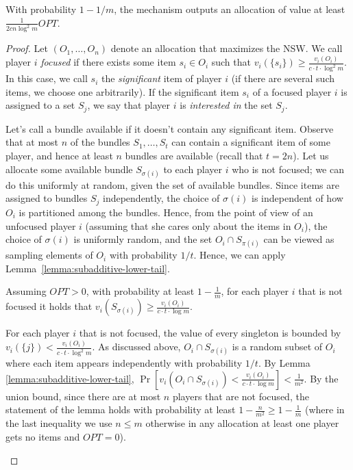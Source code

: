 \documentclass{article}
\begin{document}
\begin{lemma}
With probability $1-1/m$, the mechanism outputs an allocation of value at least  $\frac{1}{2c n \log^2 m} OPT$.
\end{lemma}

\begin{proof}
Let $(O_1,\ldots, O_n)$ denote an allocation that maximizes the NSW. We call player $i$ \emph{focused} if there exists some item $s_i \in O_i$ such that $v_i(\{s_i\})\geq \frac {v_i(O_i)} {c\cdot t \cdot \log^2 m}$. In this case, we call $s_i$ the \emph{significant} item of player $i$ (if there are several such items, we choose one arbitrarily). If the significant item $s_i$ of a focused player $i$ is assigned to a set $S_j$, we say that player $i$ is \emph{interested in} the set $S_j$.

Let's call a bundle available if it doesn't contain any significant item.  Observe that at most $n$ of the bundles $S_1,\ldots,S_t$ can contain a significant item of some player, and hence at least $n$ bundles are available (recall that $t=2n$). Let us allocate some available bundle $S_{\sigma(i)}$ to each player $i$ who is not focused; we can do this uniformly at random, given the set of available bundles. Since items are assigned to bundles $S_j$ independently, the choice of $\sigma(i)$ is independent of how $O_i$ is partitioned among the bundles. Hence, from the point of view of an unfocused player $i$ (assuming that she cares only about the items in $O_i$), the choice of $\sigma(i)$ is uniformly random, and the set $O_i \cap S_{\pi(i)}$ can be viewed as sampling elements of $O_i$ with probability $1/t$. Hence, we can apply Lemma~\ref{lemma:subadditive-lower-tail}. 





\begin{claim*}\label{algs-corollary-non-focused-value}
Assuming $OPT>0$, with probability at least $1-\frac 1 {m}$, for each player $i$ that is not focused it holds that $v_i(S_{\sigma(i)}) \geq \frac {v_i(O_i)} {c\cdot t\cdot \log m}$.   
\end{claim*}

\begin{subproof}
For each player $i$ that is not focused, the value of every singleton is bounded by $v_i(\{j\}) < \frac{v_i(O_i)}{c \cdot t \cdot \log^2m}$.
As discussed above, $O_i \cap S_{\sigma(i)}$ is a random subset of $O_i$ where each item appears independently with probability $1/t$.
By Lemma \ref{lemma:subadditive-lower-tail}, 
 $\Pr[v_i(O_i \cap S_{\sigma(i)}) < \frac {v_i(O_i)} {c \cdot t \cdot\log m}]<\frac 1 {m^2}$. By the union bound, since there are at most $n$ players that are not focused, the statement of the lemma holds with probability at least $1-\frac n {m^2}\geq 1 - \frac 1 m$
(where in the last inequality we use $n\leq m$ otherwise in any allocation at least one player gets no items and $OPT =0$).
\end{subproof}


\end{proof}
\end{document}
